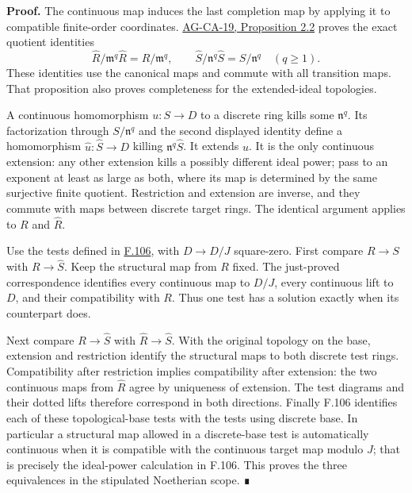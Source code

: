 \documentclass[11pt,a4paper,openany]{report}
\begin{document}
\textbf{Proof.} The continuous map induces the last completion map by applying it to compatible finite-order coordinates. \href{https://github.com/KokunoYumeto/open-math-courses/blob/d02d0a3669f42579db037cd44de1d113fdd770a1/docs/courses/AG-CA/src/completion.md}{AG-CA-19, Proposition 2.2} proves the exact quotient identities \[
\widehat R/\mathfrak m^q\widehat R=R/\mathfrak m^q,
\qquad
\widehat S/\mathfrak n^q\widehat S=S/\mathfrak n^q
\quad(q\ge1).
\] These identities use the canonical maps and commute with all transition maps. That proposition also proves completeness for the extended-ideal topologies.

A continuous homomorphism \(u:S\to D\) to a discrete ring kills some \(\mathfrak n^q\). Its factorization through \(S/\mathfrak n^q\) and the second displayed identity define a homomorphism \(\widehat u:\widehat S\to D\) killing \(\mathfrak n^q\widehat S\). It extends \(u\). It is the only continuous extension: any other extension kills a possibly different ideal power; pass to an exponent at least as large as both, where its map is determined by the same surjective finite quotient. Restriction and extension are inverse, and they commute with maps between discrete target rings. The identical argument applies to \(R\) and \(\widehat R\).

Use the tests defined in \hyperref[AG-RG-S05-more-algebra-lemma-formally-smooth]{F.106}, with \(D\to D/J\) square-zero. First compare \(R\to S\) with \(R\to\widehat S\). Keep the structural map from \(R\) fixed. The just-proved correspondence identifies every continuous map to \(D/J\), every continuous lift to \(D\), and their compatibility with \(R\). Thus one test has a solution exactly when its counterpart does.

Next compare \(R\to\widehat S\) with \(\widehat R\to\widehat S\). With the original topology on the base, extension and restriction identify the structural maps to both discrete test rings. Compatibility after restriction implies compatibility after extension: the two continuous maps from \(\widehat R\) agree by uniqueness of extension. The test diagrams and their dotted lifts therefore correspond in both directions. Finally F.106 identifies each of these topological-base tests with the tests using discrete base. In particular a structural map allowed in a discrete-base test is automatically continuous when it is compatible with the continuous target map modulo \(J\); that is precisely the ideal-power calculation in F.106. This proves the three equivalences in the stipulated Noetherian scope. ∎
\end{document}
